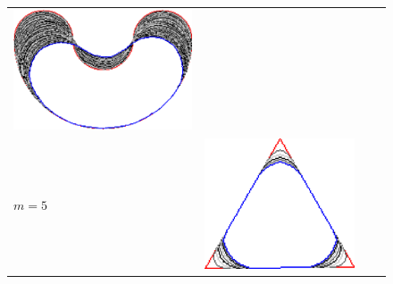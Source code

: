 \begin{figure}
\begin{tabular}{p{3em}ccc}
\includegraphics[scale=0.25]{figures/chapter6/level-effect/bean/improve/len_pen0/radius-5/level4/summary.pdf} \\[2em]
$m=5$ & \includegraphics[scale=0.25]{figures/chapter6/level-effect/triangle/improve/len_pen0/radius-5/level5/summary.pdf} &

\end{tabular}
\end{figure}
